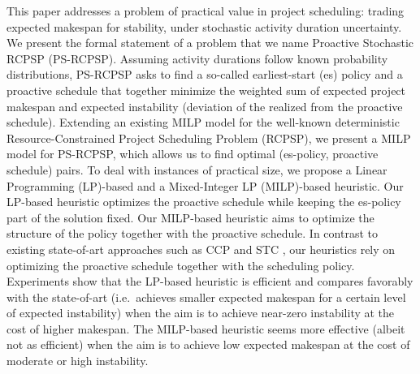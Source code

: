 This paper addresses a problem of practical value in project scheduling:
trading expected makespan for stability,
under stochastic activity duration uncertainty.
We present the formal statement of a problem 
that we name Proactive Stochastic RCPSP (PS-RCPSP).
Assuming activity durations follow known probability distributions,
PS-RCPSP asks to find a so-called earliest-start (es) policy and
a proactive schedule that together minimize the weighted 
sum of expected project makespan and expected instability
(deviation of the realized from the proactive schedule).
%
Extending an existing MILP model for the well-known deterministic 
Resource-Constrained Project Scheduling Problem (RCPSP),
we present a MILP model for PS-RCPSP, which allows us to 
find optimal (es-policy, proactive schedule) pairs.
To deal with instances of practical size,
we propose a Linear Programming (LP)-based 
and a Mixed-Integer LP (MILP)-based heuristic.
Our LP-based heuristic optimizes the proactive schedule while 
keeping the es-policy part of the solution fixed.
Our MILP-based heuristic aims to optimize the structure of the policy together with the proactive schedule.
In contrast to existing state-of-art approaches such as
CCP \cite{lamas2014purely} and STC \cite{van2008},
our heuristics rely on optimizing the proactive schedule together with the scheduling policy.
%
Experiments show that the LP-based heuristic is efficient and compares favorably with the state-of-art 
(i.e.\ achieves smaller expected makespan for a certain level of expected instability)
when the aim is to achieve near-zero instability at the cost of higher makespan.
The MILP-based heuristic seems more effective (albeit not as efficient) when the aim is to
achieve low expected makespan at the cost of moderate or high instability.
